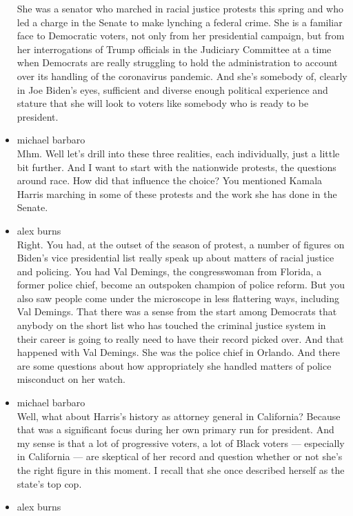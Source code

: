 \begin{itemize}
  She was a senator who marched in racial justice protests this spring
  and who led a charge in the Senate to make lynching a federal crime.
  She is a familiar face to Democratic voters, not only from her
  presidential campaign, but from her interrogations of Trump officials
  in the Judiciary Committee at a time when Democrats are really
  struggling to hold the administration to account over its handling of
  the coronavirus pandemic. And she's somebody of, clearly in Joe
  Biden's eyes, sufficient and diverse enough political experience and
  stature that she will look to voters like somebody who is ready to be
  president.
\item
  michael barbaro\\
  Mhm. Well let's drill into these three realities, each individually,
  just a little bit further. And I want to start with the nationwide
  protests, the questions around race. How did that influence the
  choice? You mentioned Kamala Harris marching in some of these protests
  and the work she has done in the Senate.
\item
  alex burns\\
  Right. You had, at the outset of the season of protest, a number of
  figures on Biden's vice presidential list really speak up about
  matters of racial justice and policing. You had Val Demings, the
  congresswoman from Florida, a former police chief, become an outspoken
  champion of police reform. But you also saw people come under the
  microscope in less flattering ways, including Val Demings. That there
  was a sense from the start among Democrats that anybody on the short
  list who has touched the criminal justice system in their career is
  going to really need to have their record picked over. And that
  happened with Val Demings. She was the police chief in Orlando. And
  there are some questions about how appropriately she handled matters
  of police misconduct on her watch.
\item
  michael barbaro\\
  Well, what about Harris's history as attorney general in California?
  Because that was a significant focus during her own primary run for
  president. And my sense is that a lot of progressive voters, a lot of
  Black voters --- especially in California --- are skeptical of her
  record and question whether or not she's the right figure in this
  moment. I recall that she once described herself as the state's top
  cop.
\item
  alex burns\\

\end{itemize}
